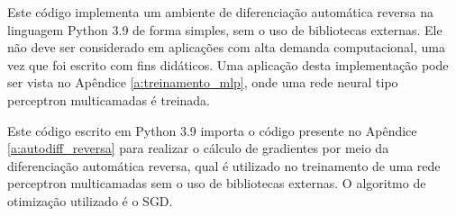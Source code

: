   Este código implementa um ambiente de diferenciação automática reversa na linguagem Python 3.9 de forma simples, sem o uso de bibliotecas externas. Ele não deve ser considerado em aplicações com alta demanda computacional, uma vez que foi escrito com fins didáticos. Uma aplicação desta implementação pode ser vista no Apêndice \ref{a:treinamento_mlp}, onde uma rede neural tipo perceptron multicamadas é treinada.

  


 \label{a:treinamento_mlp}

  Este código escrito em Python 3.9 importa o código presente no Apêndice \ref{a:autodiff_reversa} para realizar o cálculo de gradientes por meio da diferenciação automática reversa, qual é utilizado no treinamento de uma rede perceptron multicamadas sem o uso de bibliotecas externas. O algoritmo de otimização utilizado é o SGD.

  

